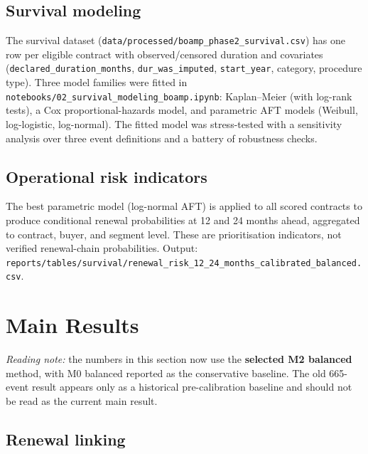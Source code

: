 \documentclass[11pt,a4paper]{article}
\begin{document}
\subsection{Survival modeling}
\label{sec:survival}
The survival dataset (\nolinkurl{data/processed/boamp_phase2_survival.csv}) has
one row per eligible contract with observed/censored duration and covariates
(\nolinkurl{declared_duration_months}, \nolinkurl{dur_was_imputed},
\texttt{start\_year}, category, procedure type). Three model families were
fitted in \nolinkurl{notebooks/02_survival_modeling_boamp.ipynb}: Kaplan--Meier
(with log-rank tests), a Cox proportional-hazards model, and parametric AFT
models (Weibull, log-logistic, log-normal). The fitted model was stress-tested
with a sensitivity analysis over three event definitions and a battery of
robustness checks.

\subsection{Operational risk indicators}
\label{sec:operational}
The best parametric model (log-normal AFT) is applied to all scored contracts to
produce conditional renewal probabilities at 12 and 24 months ahead, aggregated
to contract, buyer, and segment level. These are prioritisation indicators, not
verified renewal-chain probabilities. Output:
\nolinkurl{reports/tables/survival/renewal_risk_12_24_months_calibrated_balanced.csv}.

\section{Main Results}
\label{sec:results}

\emph{Reading note:} the numbers in this section now use the \textbf{selected
M2 balanced} method, with M0 balanced reported as the conservative baseline.
The old 665-event result appears only as a historical pre-calibration baseline
and should not be read as the current main result.

\subsection{Renewal linking}
\end{document}
